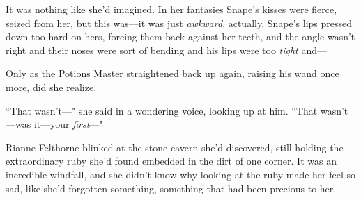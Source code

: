 It was nothing like she'd imagined. In her fantasies Snape's kisses were fierce, seized from her, but this was---it was just \emph{awkward}, actually. Snape's lips pressed down too hard on hers, forcing them back against her teeth, and the angle wasn't right and their noses were sort of bending and his lips were too \emph{tight} and---

Only as the Potions Master straightened back up again, raising his wand once more, did she realize.

``That wasn't---" she said in a wondering voice, looking up at him. ``That wasn't---was it---your \emph{first}---"

Rianne Felthorne blinked at the stone cavern she'd discovered, still holding the extraordinary ruby she'd found embedded in the dirt of one corner. It was an incredible windfall, and she didn't know why looking at the ruby made her feel so sad, like she'd forgotten something, something that had been precious to her.

